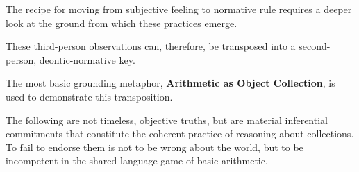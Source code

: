 \documentclass[12pt]{book}
\begin{document}
The recipe for moving from subjective feeling to normative rule requires a deeper look at the ground from which these practices emerge.

These third-person observations can, therefore, be transposed into a second-person, deontic-normative key.

The most basic grounding metaphor, \textbf{Arithmetic as Object Collection}, is used to demonstrate this transposition.

The following are not timeless, objective truths, but are material inferential commitments that constitute the coherent practice of reasoning about collections. To fail to endorse them is not to be wrong about the world, but to be incompetent in the shared language game of basic arithmetic.
\end{document}

